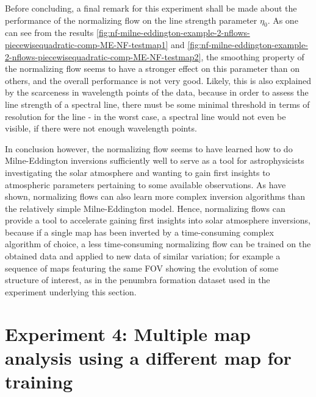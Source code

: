 \documentclass[a4paper,12pt]{report}
\begin{document}
Before concluding, a final remark for this experiment shall be made about the performance of the normalizing flow on the line strength parameter $\eta_0$. As one can see from the results \cref{fig:nf-milne-eddington-example-2-nflows-piecewisequadratic-comp-ME-NF-testmap1} and \cref{fig:nf-milne-eddington-example-2-nflows-piecewisequadratic-comp-ME-NF-testmap2}, the smoothing property of the normalizing flow seems to have a stronger effect on this parameter than on others, and the overall performance is not very good. Likely, this is also explained by the scarceness in wavelength points of the data, because in order to assess the line strength of a spectral line, there must be some minimal threshold in terms of resolution for the line - in the worst case, a spectral line would not even be visible, if there were not enough wavelength points.

In conclusion however, the normalizing flow seems to have learned how to do Milne-Eddington inversions sufficiently well to serve as a tool for astrophysicists investigating the solar atmosphere and wanting to gain first insights to atmospheric parameters pertaining to some available observations. As \cite{DiazBaso.2022} have shown, normalizing flows can also learn more complex inversion algorithms than the relatively simple Milne-Eddington model. Hence, normalizing flows can provide a tool to accelerate gaining first insights into solar atmosphere inversions, because if a single map has been inverted by a time-consuming complex algorithm of choice, a less time-consuming normalizing flow can be trained on the obtained data and applied to new data of similar variation; for example a sequence of maps featuring the same FOV showing the evolution of some structure of interest, as in the penumbra formation dataset used in the experiment underlying this section.

\FloatBarrier
\section{Experiment 4: Multiple map analysis using a different map for training}
\end{document}
